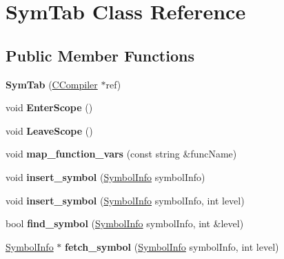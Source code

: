 \hypertarget{classSymTab}{\section{Sym\-Tab Class Reference}
\label{classSymTab}
}
\subsection*{Public Member Functions}
\begin{DoxyCompactItemize}
\item 
\hypertarget{classSymTab_a20c7b65c7ffb728fa792e87258d381a2}{{\bfseries Sym\-Tab} (\hyperlink{classCCompiler}{C\-Compiler} $\ast$ref)}\label{classSymTab_a20c7b65c7ffb728fa792e87258d381a2}

\item 
\hypertarget{classSymTab_af335dd1ba840dfab4219856545d5d8ef}{void {\bfseries Enter\-Scope} ()}\label{classSymTab_af335dd1ba840dfab4219856545d5d8ef}

\item 
\hypertarget{classSymTab_afd2c44208cdad3ddfc85136136cd27c3}{void {\bfseries Leave\-Scope} ()}\label{classSymTab_afd2c44208cdad3ddfc85136136cd27c3}

\item 
\hypertarget{classSymTab_aaca51de0935bbdbf3fdf434deccccb92}{void {\bfseries map\-\_\-function\-\_\-vars} (const string \&func\-Name)}\label{classSymTab_aaca51de0935bbdbf3fdf434deccccb92}

\item 
\hypertarget{classSymTab_ad8e59e29c50f039570c5844871bf838c}{void {\bfseries insert\-\_\-symbol} (\hyperlink{structSymbolInfo}{Symbol\-Info} symbol\-Info)}\label{classSymTab_ad8e59e29c50f039570c5844871bf838c}

\item 
\hypertarget{classSymTab_a8372047f573c6d84fa231aa7e9842280}{void {\bfseries insert\-\_\-symbol} (\hyperlink{structSymbolInfo}{Symbol\-Info} symbol\-Info, int level)}\label{classSymTab_a8372047f573c6d84fa231aa7e9842280}

\item 
\hypertarget{classSymTab_a2aedd91e00780c889e60a60fc0795daf}{bool {\bfseries find\-\_\-symbol} (\hyperlink{structSymbolInfo}{Symbol\-Info} symbol\-Info, int \&level)}\label{classSymTab_a2aedd91e00780c889e60a60fc0795daf}

\item 
\hypertarget{classSymTab_ac0bfd9c56cfd8e697046178629adbebc}{\hyperlink{structSymbolInfo}{Symbol\-Info} $\ast$ {\bfseries fetch\-\_\-symbol} (\hyperlink{structSymbolInfo}{Symbol\-Info} symbol\-Info, int level)}\label{classSymTab_ac0bfd9c56cfd8e697046178629adbebc}


\end{DoxyCompactItemize}
